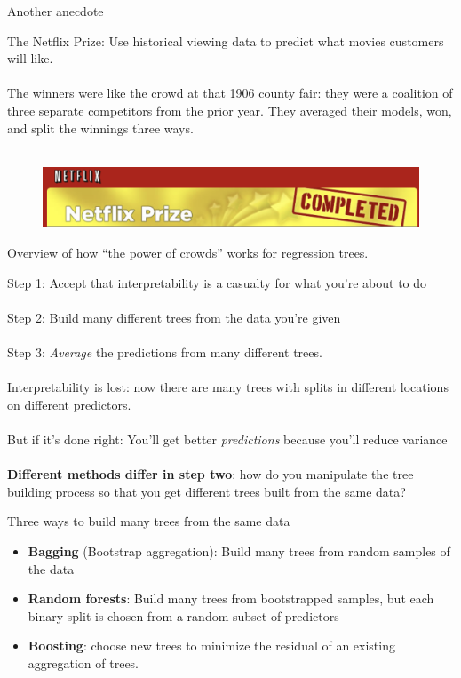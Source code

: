 \documentclass[mathserif, aspectratio=169]{beamer}
\begin{document}
\begin{frame}{Another anecdote}

The Netflix Prize: Use historical viewing data to predict what movies customers will like.  \\~\\

\pause
The winners were like the crowd at that 1906 county fair: they were a coalition of three separate competitors from the prior year.  They averaged their models, won, and split the winnings three ways.\\~\\

\begin{figure}
\includegraphics[width=\textwidth]{netflix}
\caption*{}
\end{figure}

\end{frame}
\begin{frame}{Overview of how ``the power of crowds'' works for regression trees.}

Step 1: Accept that interpretability is a casualty for what you're about to do\\~\\
\pause
Step 2: Build many different trees from the data you're given\\~\\
\pause
Step 3: \textit{Average }the predictions from many different trees.\\~\\
\pause
Interpretability is lost: now there are many trees with splits in different locations on different predictors.  \\~\\

But if it's done right: You'll get better \textit{predictions} because you'll reduce variance\\~\\

\textbf{Different methods differ in step two}: how do you manipulate the tree building process so that you get different trees built from the same data?

\end{frame}

\begin{frame}{Three ways to build many trees from the same data}

\begin{itemize}
\item \textbf{Bagging} (Bootstrap aggregation): Build many trees from random samples of the data
\item \textbf{Random forests}: Build many trees from bootstrapped samples, but each binary split is chosen from a random subset of predictors
\item \textbf{Boosting}: choose new trees to minimize the residual of an existing aggregation of trees.
\end{itemize}
\end{frame}
\end{document}
